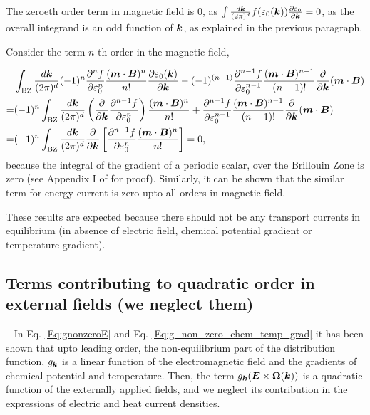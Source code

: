\documentclass{report}
\renewcommand\vec[1]{\ensuremath\boldsymbol{#1}} %
\begin{document}
The zeroeth order term in magnetic field is 0, as $\int \frac{d\vec{k}}{(2\pi)^d} f(\varepsilon_0(\vec{k})) \frac{\partial \varepsilon_0} {\partial \vec{k}} = 0$, as the overall integrand is an odd function of $\vec{k}$, as explained in the previous paragraph.
	
Consider the term $n$-th order in the magnetic field,

$$
\begin{aligned}
	& \int_{\text{BZ}} \frac{d\vec{k}}{(2\pi)^d} (-1)^{n} \frac{\partial^{n} f}{\partial \varepsilon_{0}^{n}} \frac{(\vec{m} \cdot \vec{B})^n}{n !}\frac{\partial \varepsilon_0 (\vec{k})}{\partial \vec{k}} - (-1)^{(n-1)}  \frac{\partial^{n-1} f}{\partial \varepsilon_{0}^{n-1}} \frac{(\vec{m} \cdot \vec{B})^{n-1}}{(n-1) !} \frac{\partial }{\partial \vec{k}}(\vec{m}\cdot\vec{B}) \\
	= & (-1)^n \int_{\text{BZ}} \frac{d\vec{k}}{(2\pi)^d} \left(\frac{\partial}{\partial \vec{k}}\frac{\partial^{n-1} f}{\partial \varepsilon_{0}^n}\right) \frac{(\vec{m} \cdot \vec{B})^n}{n !} + \frac{\partial^{n-1} f}{\partial \varepsilon_{0}^{n-1}} \frac{(\vec{m} \cdot \vec{B})^{n-1}}{(n-1) !} \frac{\partial }{\partial \vec{k}}(\vec{m}\cdot\vec{B}) \\
	= & (-1)^n \int_{\text{BZ}} \frac{d\vec{k}}{(2\pi)^d} \frac{\partial}{\partial \vec{k}} \left[\frac{\partial^{n-1} f}{\partial \varepsilon_{0}^n} \frac{(\vec{m} \cdot \vec{B})^n}{n !}\right] = 0 ,
\end{aligned}
$$
because the integral of the gradient of a periodic scalar, over the Brillouin Zone is zero (see Appendix I of \cite{book:AshcroftMermin76} for proof).
Similarly, it can be shown that the similar term for energy current is zero upto all orders in magnetic field.

These results are expected because there should not be any transport currents in equilibrium (in absence of electric field, chemical potential gradient or temperature gradient).
\subsection{Terms contributing to quadratic order  in external fields (we neglect them)}~\label{sec:quadCont}
In Eq. \eqref{Eq:gnonzeroE} and Eq. \eqref{Eq:g_non_zero_chem_temp_grad} it has been shown that upto leading order, the non-equilibrium part of the distribution function, ${g}_{\vec{k}}$ is a linear function of the electromagnetic field and the gradients of chemical potential and temperature. Then, the term ${g}_{\vec{k}} (\vec{E}\times\vec{\Omega}(\vec{k}))$ is a quadratic function of the externally applied fields, and we neglect its contribution in the expressions of electric and heat current densities.
\end{document}
